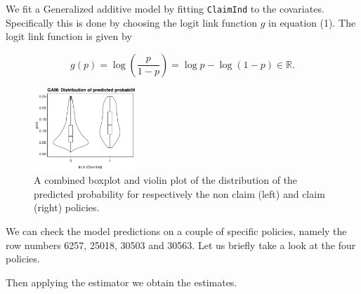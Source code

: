 \documentclass[
]{article}
\begin{document}
We fit a Generalized additive model by fitting \texttt{ClaimInd} to the
covariates. Specifically this is done by choosing the logit link
function \(g\) in equation (1). The logit link function is given by

\[
g(p)=\log\left(\frac{p}{1-p}\right)=\log p-\log(1-p)\in \mathbb R.
\]

\begin{figure}[h]
    \centering
    \includegraphics[width=0.34\textwidth]{figures/freq_p_gam_wide.png}
    \caption{A combined boxplot and violin plot of the distribution of the predicted probability for respectively the non claim (left) and claim (right) policies.}
\end{figure}

We can check the model predictions on a couple of specific policies,
namely the row numbers 6257, 25018, 30503 and 30563. Let us briefly take
a look at the four policies.

Then applying the estimator we obtain the estimates.
\end{document}
